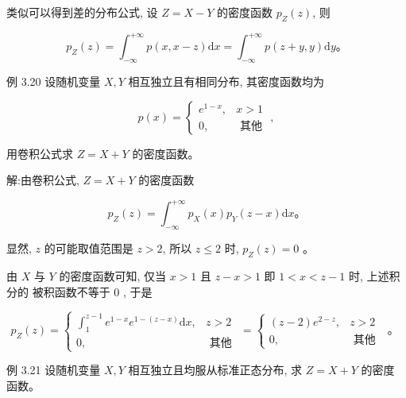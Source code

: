 \documentclass{beamer}
\begin{document}
	\begin{frame}
		类似可以得到差的分布公式, 设 $Z=X-Y$ 的密度函数 $p_{Z}(z)$, 则
		
		$$
		p_{Z}(z)=\int_{-\infty}^{+\infty} p(x, x-z) \mathrm{d} x=\int_{-\infty}^{+\infty} p(z+y, y) \mathrm{d} y 。
		$$
	\end{frame}
	
	\begin{frame}
		例 3.20 设随机变量 $X, Y$ 相互独立且有相同分布, 其密度函数均为
		
		$$
		p(x)=\left\{\begin{array}{cc}
			e^{1-x}, & x>1 \\
			0, & \text { 其他 }
		\end{array},\right.
		$$
		
		用卷积公式求 $Z=X+Y$ 的密度函数。 
	\end{frame}
	
	\begin{frame}
		解:由卷积公式, $Z=X+Y$ 的密度函数
		
		$$
		p_{Z}(z)=\int_{-\infty}^{+\infty} p_{X}(x) p_{Y}(z-x) \mathrm{d} x 。
		$$
		
		显然, $z$ 的可能取值范围是 $z>2$, 所以 $z \leqslant 2$ 时, $p_{Z}(z)=0$ 。
		
		由 $X$ 与 $Y$ 的密度函数可知, 仅当 $x>1$ 且 $z-x>1$ 即 $1<x<z-1$ 时, 上述积分的 被积函数不等于 0 , 于是
		
		$$
		p_{Z}(z)=\left\{\begin{array}{cc}
			\int_{1}^{z-1} e^{1-x} e^{1-(z-x)} \mathrm{d} x, & z>2 \\
			0, & \text { 其他 }
		\end{array}=\left\{\begin{array}{cl}
			(z-2) e^{2-z}, & z>2 \\
			0, & \text { 其他 }
		\end{array}\right. \text { 。 }\right.
		$$
	\end{frame}
	
	\begin{frame}
		例 3.21 设随机变量 $X, Y$ 相互独立且均服从标准正态分布, 求 $Z=X+Y$ 的密度 函数。
	\end{frame}
	
\end{document}
